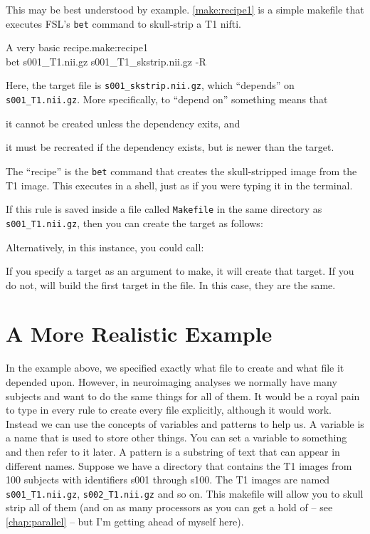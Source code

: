This may be best understood by example. \autoref{make:recipe1} is a simple makefile that executes FSL's \texttt{bet} command to skull-strip a T1 nifti.
	
\begin{make}{A very basic \maken{} recipe.}{make:recipe1}
	 \\
	\tab	bet s001_T1.nii.gz s001_T1_skstrip.nii.gz -R
\end{make}
	
Here, the target file is \texttt{s001_skstrip.nii.gz}, which ``depends'' on \texttt{s001_T1.nii.gz}. More specifically, to ``depend on'' something means that \begin{inparaenum} \item it cannot be created unless the dependency exits, and \item it must be recreated if the dependency exists, but is newer than the target. \end{inparaenum}
	
The ``recipe'' is the \texttt{bet} command that creates the skull-stripped image from the T1 image. This executes in a shell, just as if you were typing it in the terminal.
	
If this rule is saved inside a file called \texttt{Makefile} in the same directory as \texttt{s001_T1.nii.gz}, then you can create the target as follows:	
	
Alternatively, in this instance, you could call:
	
If you specify a target as an argument to make, it will create that target. If you do not, \maken{} will build the first target in the file. In this case, they are the same.
	
\section{A More Realistic Example}
	
In the example above, we specified exactly what file to create and what file it depended upon. However, in neuroimaging analyses we normally have many subjects and want to do the same things for all of them. It would be a royal pain to type in every rule to create every file explicitly, although it would work. Instead we can use the concepts of variables and patterns to help us. 
A variable is a name that is used to store other things. You can set a variable to something and then refer to it later. A pattern is a substring of text that can appear in different names.
Suppose we have a directory that contains the T1 images from 100 subjects with identifiers s001 through s100. The T1 images are named \texttt{s001_T1.nii.gz}, \texttt{s002_T1.nii.gz} and so on. This makefile will allow you to skull strip all of them (and on as many processors as you can get a hold of -- see \autoref{chap:parallel} -- but I'm getting ahead of myself here).
	
